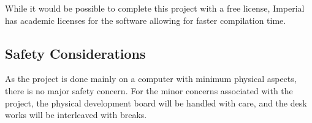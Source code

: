 While it would be possible to complete this project with a free license,
Imperial has academic licenses for the software allowing for faster
compilation time.


\subsection{Safety Considerations}
As the project is done mainly on a computer with minimum physical aspects,
there is no major safety concern.
For the minor concerns associated with the project, 
the physical development board will be handled with care, and the desk works
will be interleaved with breaks.